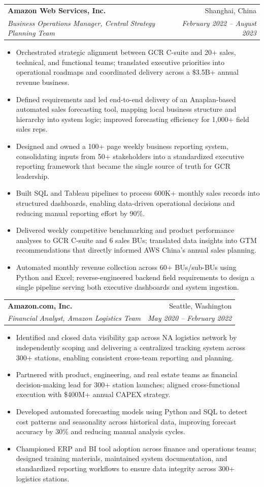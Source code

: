 \documentclass[letterpaper,10pt]{article}
\makeatletter
\newcommand{\resumeItem}[1]{\item\small{{#1\vspace{-2pt}}}}
\newcommand{\resumeSubheading}[4]{
  \vspace{-2pt}\item
  \begin{tabular*}{0.97\textwidth}[t]{l@{\extracolsep{\fill}}r}
    \textbf{#1} & #2 \\
    \textit{\small#3} & \textit{\small #4} \\
  \end{tabular*}\vspace{-9pt}}
\newcommand{\resumeItemListStart}{\begin{itemize}}
\newcommand{\resumeItemListEnd}{\end{itemize}\vspace{-7pt}}
\makeatother
\begin{document}
  \resumeSubheading{Amazon Web Services, Inc.}{Shanghai, China}{Business Operations Manager, Central Strategy Planning Team}{February 2022 -- August 2023}
  \resumeItemListStart
    \resumeItem{Orchestrated strategic alignment between GCR C-suite and 20+ sales, technical, and functional teams; translated executive priorities into operational roadmaps and coordinated delivery across a \$3.5B+ annual revenue business.}
    \resumeItem{Defined requirements and led end-to-end delivery of an Anaplan-based automated sales forecasting tool, mapping local business structure and hierarchy into system logic; improved forecasting efficiency for 1,000+ field sales reps.}
    \resumeItem{Designed and owned a 100+ page weekly business reporting system, consolidating inputs from 50+ stakeholders into a standardized executive reporting framework that became the single source of truth for GCR leadership.}
    \resumeItem{Built SQL and Tableau pipelines to process 600K+ monthly sales records into structured dashboards, enabling data-driven operational decisions and reducing manual reporting effort by 90\%.}
    \resumeItem{Delivered weekly competitive benchmarking and product performance analyses to GCR C-suite and 6 sales BUs; translated data insights into GTM recommendations that directly informed AWS China's annual sales planning.}
    \resumeItem{Automated monthly revenue collection across 60+ BUs/sub-BUs using Python and Excel; reverse-engineered backend field requirements to design a single pipeline serving both executive dashboards and system ingestion.}
  \resumeItemListEnd

  \resumeSubheading{Amazon.com, Inc.}{Seattle, Washington}{Financial Analyst, Amazon Logistics Team}{May 2020 -- February 2022}
  \resumeItemListStart
    \resumeItem{Identified and closed data visibility gap across NA logistics network by independently scoping and delivering a centralized tracking system across 300+ stations, enabling consistent cross-team reporting and planning.}
    \resumeItem{Partnered with product, engineering, and real estate teams as financial decision-making lead for 300+ station launches; aligned cross-functional execution with \$400M+ annual CAPEX strategy.}
    \resumeItem{Developed automated forecasting models using Python and SQL to detect cost patterns and seasonality across historical data, improving forecast accuracy by 30\% and reducing manual analysis cycles.}
    \resumeItem{Championed ERP and BI tool adoption across finance and operations teams; designed training materials, maintained system documentation, and standardized reporting workflows to ensure data integrity across 300+ logistics stations.}
  \resumeItemListEnd
\end{document}
